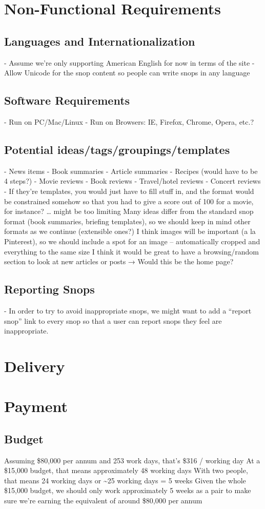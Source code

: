 \documentclass[11pt]{article}
\begin{document}
\section{Non-Functional Requirements}
\subsection{Languages and Internationalization}
- Assume we’re only supporting American English for now in terms of the site
- Allow Unicode for the snop content so people can write snops in any language
\subsection{Software Requirements}
- Run on PC/Mac/Linux
- Run on Browsers: IE, Firefox, Chrome, Opera, etc.?
\subsection{Potential ideas/tags/groupings/templates}
- News items
- Book summaries
- Article summaries
- Recipes (would have to be 4 steps?)
- Movie reviews
- Book reviews
- Travel/hotel reviews
- Concert reviews
- If they’re templates, you would just have to fill stuff in, and the format would be constrained somehow so that you had to give a score out of 100 for a movie, for instance? … might be too limiting
Many ideas differ from the standard snop format (book summaries, briefing templates), so we should keep in mind other formats as we continue (extensible ones?)
I think images will be important (a la Pinterest), so we should include a spot for an image -- automatically cropped and everything to the same size
I think it would be great to have a browsing/random section to look at new articles or posts → Would this be the home page?
\subsection{Reporting Snops}
- In order to try to avoid inappropriate snops, we might want to add a “report snop” link to every snop so that a user can report snops they feel are inappropriate.
\section{Delivery}
\section{Payment}	
\subsection{Budget}
Assuming \$80,000 per annum and 253 work days, that’s \$316 / working day
At a \$15,000 budget, that means approximately 48 working days
With two people, that means 24 working days or \~{}25 working days = 5 weeks
Given the whole \$15,000 budget, we should only work approximately 5 weeks as a pair to make sure we’re earning the equivalent of around \$80,000 per annum
\end{document}
